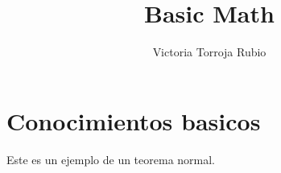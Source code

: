 \documentclass{report}
\begin{document}
\title{Basic Math}
\author{Victoria Torroja Rubio}
\date{}

\maketitle

\tableofcontents

\section{Conocimientos basicos}
\begin{ftheorem}[]
\normalfont Este es un ejemplo de un teorema normal. 
\end{ftheorem}
\end{document}
